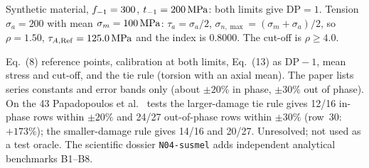  Synthetic material, $f_{-1}=300$, $t_{-1}=200\,\mathrm{MPa}$: both limits give
$\mathrm{DP}=1$. Tension $\sigma_a=200$ with mean $\sigma_m=100\,\mathrm{MPa}$: $\tau_a=\sigma_a/2$,
$\sigma_{n,\max}=(\sigma_m+\sigma_a)/2$, so $\rho=1.50$, $\tau_{A,\mathrm{Ref}}=125.0\,\mathrm{MPa}$ and the index
is 0.8000. The cut-off is $\rho\ge4.0$.

 Eq.~(8) reference points, calibration at both limits, Eq.~(13) as
$\mathrm{DP}-1$, mean stress and cut-off, and the tie rule (torsion with an axial mean). The paper
lists series constants and error bands only (about $\pm20\%$ in phase, $\pm30\%$ out of phase). On the
43 Papadopoulos et al.\ \cite{papadopoulos1997} tests the larger-damage tie rule gives 12/16 in-phase
rows within $\pm20\%$ and 24/27 out-of-phase rows within $\pm30\%$ (row~30: $+173\%$); the
smaller-damage rule gives 14/16 and 20/27. Unresolved; not used as a test oracle. The scientific dossier \texttt{N04-susmel} adds independent
analytical benchmarks B1--B8.
